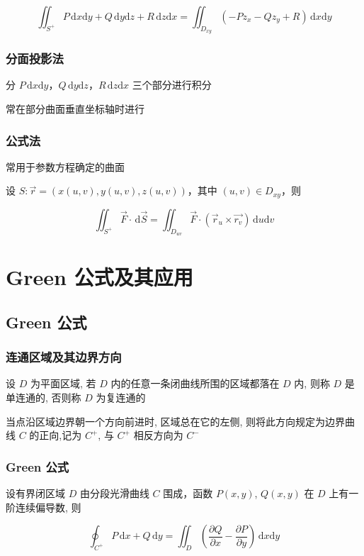 \documentclass[lang = zh , final , oneside , openany , titlepage , zihao = -4 , linespread = 1.3 , baselineskip = false , cjk-font = windows , text-font = newtx , math-font = newtx , math-style = ISO , uppercase-greek = upright , integral-limits = false]{sjtureport}
\begin{document}
\[\iint_{S^+}P\,\mathrm{d}x\mathrm{d}y + Q\,\mathrm{d}y\mathrm{d}z + R\,\mathrm{d}z\mathrm{d}x = \iint_{D_{xy}} \left(-Pz_x-Qz_y+R\right)\,\mathrm{d}x\mathrm{d}y\]

\subsubsection{分面投影法}

分
\(P\,\mathrm{d}x\mathrm{d}y\)，\(Q\,\mathrm{d}y\mathrm{d}z\)，\(R\,\mathrm{d}z\mathrm{d}x\)
三个部分进行积分

常在部分曲面垂直坐标轴时进行

\subsubsection{公式法}

常用于参数方程确定的曲面

设 \(S:\vec{r} = \left(x(u,v),y(u,v),z(u,v)\right)\)，其中
\((u,v)\in D_{xy}\)，则

\[\iint_{S^+}\vec{F}\cdot\,\mathrm{d}\vec{S} = \iint_{D_{uv}}\vec{F}\cdot\left(\vec{r}_u\times\vec{r_v}\right)\,\mathrm{d}u\mathrm{d}v\]

\section{Green 公式及其应用}

\subsection{Green 公式}

\subsubsection{连通区域及其边界方向}

设 \(D\) 为平面区域, 若 \(D\) 内的任意一条闭曲线所围的区域都落在 \(D\)
内, 则称 \(D\) 是单连通的, 否则称 \(D\) 为复连通的

当点沿区域边界朝一个方向前进时, 区域总在它的左侧,
则将此方向规定为边界曲线 \(C\) 的正向,记为 \(C^+\), 与 \(C^+\)
相反方向为 \(C^-\)

\subsubsection{Green 公式}

\begin{theorem}
    设有界闭区域 \(D\) 由分段光滑曲线 \(C\) 围成，函数 \(P(x, y)\),
\(Q(x, y)\) 在 \(D\) 上有一阶连续偏导数, 则

\[\oint_{C^+} P\,\mathrm{d}x + Q\,\mathrm{d}y = \iint_D \left(\frac{\partial Q}{\partial x} - \frac{\partial P}{\partial y}\right)\,\mathrm{d}x\mathrm{d}y\]
\end{theorem}
\end{document}
